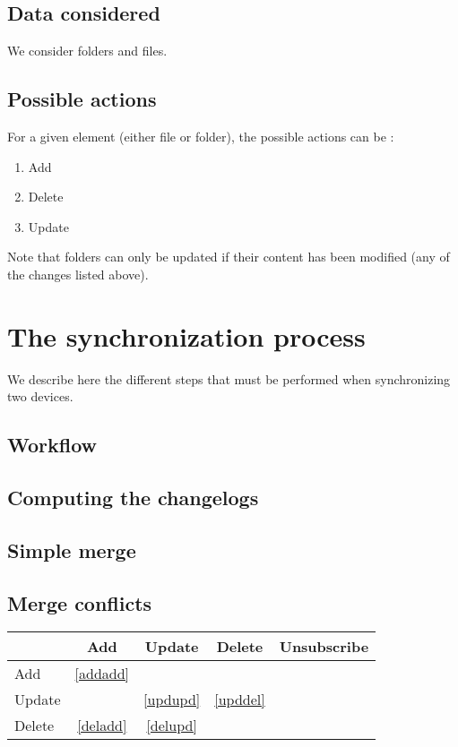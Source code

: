 \documentclass[10pt,a4paper]{article}
\begin{document}
\subsection{Data considered}

We consider folders and files.

\subsection{Possible actions}

For a given element (either file or folder), the possible actions can be :
\begin{enumerate}
\item Add
\item Delete
\item Update
\end{enumerate}

Note that folders can only be updated if their content has been modified (any of the changes listed above).

\section{The synchronization process}

We describe here the different steps that must be performed when synchronizing two devices.

\subsection{Workflow}

\subsection{Computing the changelogs}

\subsection{Simple merge}

\subsection{Merge conflicts}

\begin{tabular}{l|c c c c}
 & Add & Update & Delete & Unsubscribe \\
\hline
Add & \ref{addadd} &\\
Update & & \ref{updupd} & \ref{upddel} &\\
Delete & \ref{deladd} & \ref{delupd} & \\
\end{tabular}
\end{document}
